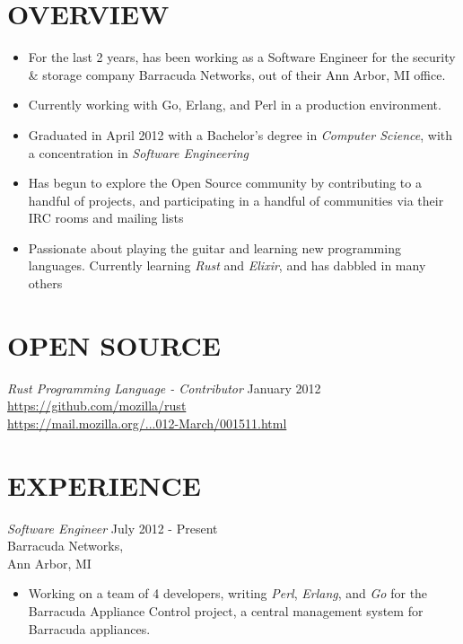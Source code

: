 \documentclass[line,margin]{res}
\begin{document}

\address{1450 Schafer Drive, Burton, MI 48509}
\address{pwoolcoc@gmail.com\ -\ (810) 412-8642}


\begin{resume}


\section{OVERVIEW}
    \begin{itemize}
        \item For the last 2 years, has been working as a Software Engineer
              for the security \& storage company Barracuda Networks,
              out of their Ann Arbor, MI office.
        \item Currently working with Go, Erlang, and Perl in a production environment.
        \item Graduated in April 2012 with a Bachelor's degree in
              {\sl Computer Science}, with a concentration in
              {\sl Software Engineering}
        \item Has begun to explore the Open Source community by contributing to
              a handful of projects, and participating in a handful
              of communities via their IRC rooms and mailing lists
        \item Passionate about playing the guitar and learning new programming
              languages. Currently learning {\sl Rust} and {\sl Elixir},
              and has dabbled in many others
    \end{itemize}



\section{OPEN SOURCE}
        {\sl Rust Programming Language - Contributor } \hfill January 2012 \\
              \href{https://github.com/mozilla/rust}{https://github.com/mozilla/rust} \\
              \href{https://mail.mozilla.org/pipermail/rust-dev/2012-March/001511.html}{https://mail.mozilla.org/...012-March/001511.html}

\section{EXPERIENCE}
    {\sl Software Engineer }
            \hfill July 2012 - Present \\
                    Barracuda Networks, \\
                    Ann Arbor, MI
        \begin{itemize}
            \item Working on a team of 4 developers, writing {\sl Perl}, {\sl Erlang},
                  and {\sl Go} for the Barracuda Appliance Control project, a central
                  management system for Barracuda appliances.
        \end{itemize}


\end{resume}
\end{document}

